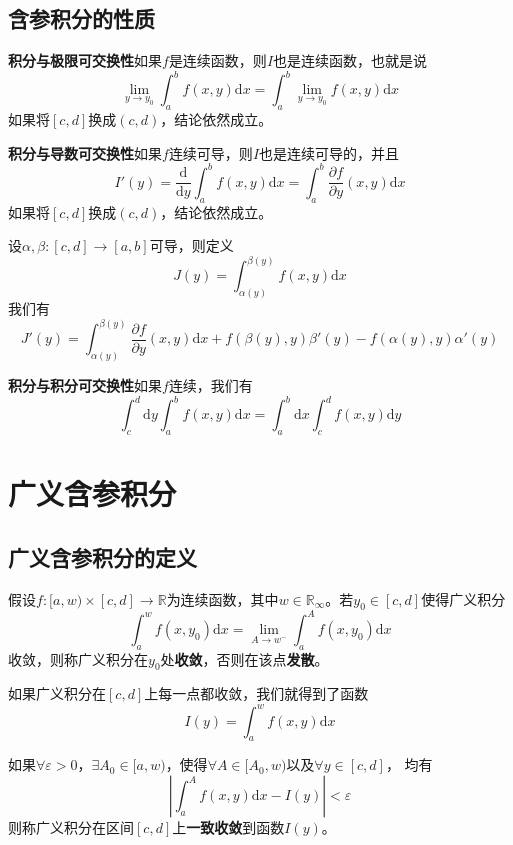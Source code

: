 \documentclass[UTF8,openany]{book}
\begin{document}
	\subsection{含参积分的性质}
	\par \textbf{积分与极限可交换性}\quad 如果$f$是连续函数，则$I$也是连续函数，也就是说
	$$\lim_{y\rightarrow y_0}\int_{a}^{b}f(x,y)\mathrm{d}x=\int_{a}^{b}\lim_{y\rightarrow y_0}f(x,y)\mathrm{d}x$$
	如果将$[c,d]$换成$(c,d)$，结论依然成立。
	\par \textbf{积分与导数可交换性}\quad 如果$f$连续可导，则$I$也是连续可导的，并且
	$$I'(y)=\frac{\mathrm{d}}{\mathrm{d}y}\int_{a}^{b}f(x,y)\mathrm{d}x=\int_{a}^{b}\frac{\partial f}{\partial y}(x,y)\mathrm{d}x$$
	如果将$[c,d]$换成$(c,d)$，结论依然成立。
	\par 设$\alpha,\beta:[c,d]\rightarrow[a,b]$可导，则定义
	$$J(y)=\int_{\alpha(y)}^{\beta(y)}f(x,y)\mathrm{d}x$$
	我们有
	$$J'(y)=\int_{\alpha(y)}^{\beta(y)}\frac{\partial f}{\partial y}(x,y)\mathrm{d}x+f(\beta(y),y)\beta'(y)-f(\alpha(y),y)\alpha'(y)$$
	\par \textbf{积分与积分可交换性}\quad 如果$f$连续，我们有
	$$\int_{c}^{d}\mathrm{d}y\int_{a}^{b}f(x,y)\mathrm{d}x=\int_{a}^{b}\mathrm{d}x\int_{c}^{d}f(x,y)\mathrm{d}y$$
	\section{广义含参积分}
	\subsection{广义含参积分的定义}
	\par 假设$f:[a,w)\times[c,d]\rightarrow\mathbb{R}$为连续函数，其中$w\in\mathbb{R}_{\infty}$。若$y_0
	\in[c,d]$使得广义积分
	$$\int_{a}^{w}f(x,y_0)\mathrm{d}x=\lim_{A\rightarrow w^-}\int_{a}^{A}f(x,y_0)\mathrm{d}x$$
	收敛，则称广义积分在$y_0$处\textbf{收敛}，否则在该点\textbf{发散}。
	\par 如果广义积分在$[c,d]$上每一点都收敛，我们就得到了函数
	$$I(y)=\int_{a}^{w}f(x,y)\mathrm{d}x$$
	\par 如果$\forall\varepsilon>0$，$\exists A_0\in[a,w)$，使得$\forall A\in[A_0,w)$以及$\forall y\in[c,d]$，
	均有
	\[
	\left|\int_{a}^{A}f(x,y)\mathrm{d}x-I(y)\right|<\varepsilon	
	\]
	则称广义积分在区间$[c,d]$上\textbf{一致收敛}到函数$I(y)$。
\end{document}

